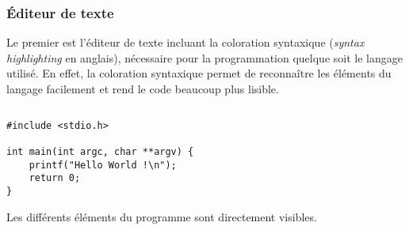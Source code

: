 \documentclass[../../main.tex]{subfiles}
\begin{document}
\subsubsection{Éditeur de texte}
Le premier est l'éditeur de texte incluant la coloration syntaxique (\textit{syntax highlighting} en anglais), nécessaire pour la programmation quelque soit le langage utilisé. En effet, la coloration syntaxique permet de reconnaître les éléments du langage facilement et rend le code beaucoup plus lisible.
\begin{lstlisting}[title=Un premier programme]
\end{lstlisting}
\begin{verbatim}
#include <stdio.h>

int main(int argc, char **argv) {
	printf("Hello World !\n");
	return 0;
}
\end{verbatim}
Les différents éléments du programme sont directement visibles.
\end{document}
